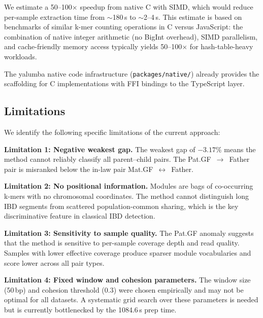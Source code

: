 \documentclass{../yalumba}
\begin{document}

We estimate a 50--100$\times$ speedup from native C with SIMD, which would
reduce per-sample extraction time from $\sim$180\,s to $\sim$2--4\,s.  This
estimate is based on benchmarks of similar k-mer counting operations in C
versus JavaScript: the combination of native integer arithmetic (no BigInt
overhead), SIMD parallelism, and cache-friendly memory access typically yields
50--100$\times$ for hash-table-heavy workloads.

The yalumba native code infrastructure (\texttt{packages/native/}) already
provides the scaffolding for C implementations with FFI bindings to the
TypeScript layer.

\subsection{Limitations}

We identify the following specific limitations of the current approach:

\begin{limitation}
\textbf{Limitation 1: Negative weakest gap.}  The weakest gap of $-3.17\%$
means the method cannot reliably classify all parent--child pairs.  The
Pat.GF~$\to$~Father pair is misranked below the in-law pair
Mat.GF~$\leftrightarrow$~Father.
\end{limitation}

\begin{limitation}
\textbf{Limitation 2: No positional information.}  Modules are bags of
co-occurring k-mers with no chromosomal coordinates.  The method cannot
distinguish long IBD segments from scattered population-common sharing,
which is the key discriminative feature in classical IBD detection.
\end{limitation}

\begin{limitation}
\textbf{Limitation 3: Sensitivity to sample quality.}  The Pat.GF anomaly
suggests that the method is sensitive to per-sample coverage depth and read
quality.  Samples with lower effective coverage produce sparser module
vocabularies and score lower across all pair types.
\end{limitation}

\begin{limitation}
\textbf{Limitation 4: Fixed window and cohesion parameters.}  The window
size (50\,bp) and cohesion threshold (0.3) were chosen empirically and may
not be optimal for all datasets.  A systematic grid search over these
parameters is needed but is currently bottlenecked by the 1084.6\,s prep time.
\end{limitation}
\end{document}
